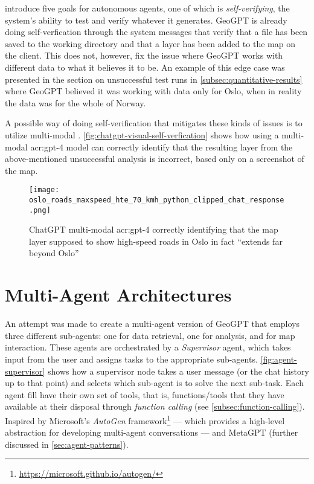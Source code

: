 \cite{liAutonomousGISNextgeneration2023} introduce five goals for autonomous agents, one of which is \textit{self-verifying}, the system's ability to test and verify whatever it generates. GeoGPT is already doing self-verfication through the system messages that verify that a file has been saved to the working directory and that a layer has been added to the map on the client. This does not, however, fix the issue where GeoGPT works with different data to what it believes it to be. An example of this edge case was presented in the section on unsuccessful test runs in \autoref{subsec:quantitative-results} where GeoGPT believed it was working with data only for Oslo, when in reality the data was for the whole of Norway.

A possible way of doing self-verification that mitigates these kinds of issues is to utilize multi-modal . \autoref{fig:chatgpt-visual-self-verfication} shows how using a multi-modal \acrshort{acr:gpt}-4 model can correctly identify that the resulting layer from the above-mentioned unsuccessful analysis is incorrect, based only on a screenshot of the map.

\begin{figure}
    \centering
    \texttt{[image: oslo\_roads\_maxspeed\_hte\_70\_kmh\_python\_clipped\_chat\_response.png]}
    \caption{ChatGPT multi-modal \acrshort{acr:gpt}-4 correctly identifying that the map layer supposed to show high-speed roads in Oslo in fact \enquote{extends far beyond Oslo}}
    \label{fig:chatgpt-visual-self-verfication}
\end{figure}

\FloatBarrier

\section{Multi-Agent Architectures}
\label{sec:multi-agent-architectures}

An attempt was made to create a multi-agent version of GeoGPT that employs three different sub-agents: one for data retrieval, one for analysis, and for map interaction. These agents are orchestrated by a \textit{Supervisor} agent, which takes input from the user and assigns tasks to the appropriate sub-agents. \autoref{fig:agent-supervisor} shows how a supervisor node takes a user message (or the chat history up to that point) and selects which sub-agent is to solve the next sub-task. Each agent fill have their own set of tools, that is, functions/tools that they have available at their disposal through \textit{function calling} (see \autoref{subsec:function-calling}). Inspired by Microsoft's \textit{AutoGen} framework\footnote{\url{https://microsoft.github.io/autogen/}} --- which provides a high-level abstraction for developing multi-agent conversations --- and MetaGPT (further discussed in \autoref{sec:agent-patterns}).

